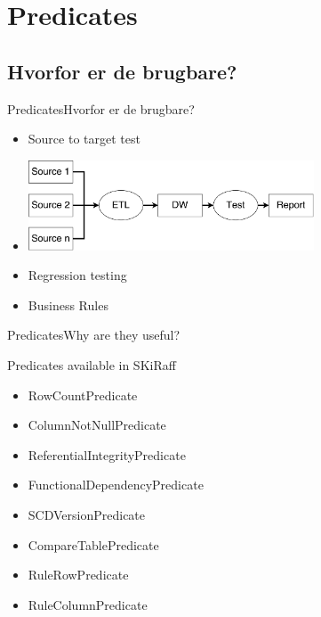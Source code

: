 
\section{Predicates}

\subsection{Hvorfor er de brugbare?}
\begin{frame}{Predicates}{Hvorfor er de brugbare?}
	\begin{itemize}
		\item<2-> Source to target test
		\item<2->[] \includegraphics[width=8.5cm]{figures/scenario.pdf}
		\item<3-> Regression testing
		\item<3-> Business Rules
	\end{itemize}
\end{frame}

\begin{frame}{Predicates}{Why are they useful?}
	\begin{block}{Predicates available in SKiRaff}
		\begin{itemize}
			\item<1-> RowCountPredicate
			\item<1-> ColumnNotNullPredicate
			\item<1-> ReferentialIntegrityPredicate
			\item<1-> FunctionalDependencyPredicate
			\item<1-> SCDVersionPredicate
			\item<1-> CompareTablePredicate
			\item<1-> RuleRowPredicate
			\item<1-> RuleColumnPredicate
		\end{itemize}
	\end{block}
\end{frame}

